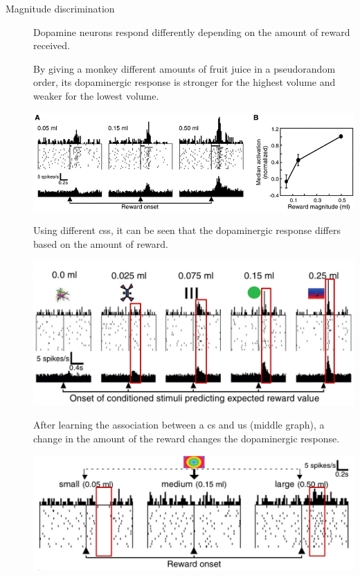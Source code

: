 \begin{description}
    \item[Magnitude discrimination] 
        Dopamine neurons respond differently depending on the amount of reward received.

        \begin{@empty}
            \small
            \begin{example}
                By giving a monkey different amounts of fruit juice in a pseudorandom order,
                its dopaminergic response is stronger for the highest volume and weaker for the lowest volume.
                \begin{center}
                    \includegraphics[width=0.7\linewidth]{./img/dopamine_monkey3.png}    
                \end{center}
            \end{example}
        \end{@empty}

        \begin{@empty}
            \small
            \begin{example}
                Using different \acp{cs}, it can be seen that the dopaminergic response differs based on the amount of reward.
                \begin{center}
                    \includegraphics[width=0.5\linewidth]{./img/dopamine_expected.png}
                \end{center}
            \end{example}
        \end{@empty}

        \begin{@empty}
            \small
            \begin{example}
                After learning the association between a \ac{cs} and \ac{us} (middle graph), a change in the amount of the reward changes the dopaminergic response.
                \begin{center}
                    \includegraphics[width=0.6\linewidth]{./img/dopamine_expected2.png}
                \end{center}


\end{example}
\end{@empty}
\end{description}
